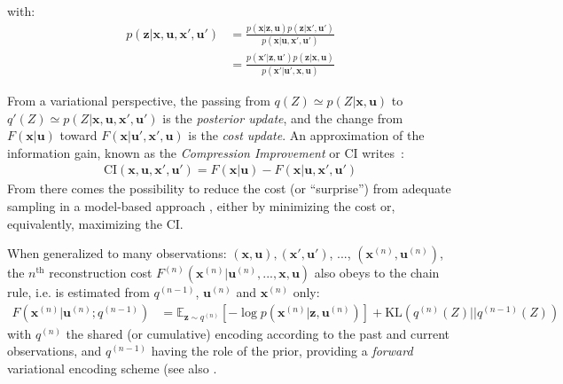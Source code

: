 \documentclass[12pt,twoside,openright]{article}
\begin{document}
with:
\begin{align} p(\boldsymbol{z}|\boldsymbol{x}, \boldsymbol{u}, \boldsymbol{x}', \boldsymbol{u}') &= \frac{p(\boldsymbol{x}|\boldsymbol{z}, \boldsymbol{u})p(\boldsymbol{z}|\boldsymbol{x}', \boldsymbol{u}')}{p(\boldsymbol{x}|\boldsymbol{u},\boldsymbol{x}',\boldsymbol{u}')}\nonumber\\
&= \frac{p(\boldsymbol{x}'|\boldsymbol{z}, \boldsymbol{u}')p(\boldsymbol{z}|\boldsymbol{x}, \boldsymbol{u})}{p(\boldsymbol{x}'|\boldsymbol{u}',\boldsymbol{x},\boldsymbol{u})}
\end{align} 

From a variational perspective, the passing from $q(Z) \simeq p(Z|\boldsymbol{x}, \boldsymbol{u})$ to $q'(Z) \simeq p(Z|\boldsymbol{x}, \boldsymbol{u}, \boldsymbol{x}', \boldsymbol{u}')$ is the \emph{posterior update}, and the change from $F(\boldsymbol{x}|\boldsymbol{u})$ toward   $F(\boldsymbol{x}|\boldsymbol{u}', \boldsymbol{x}', \boldsymbol{u})$ is the \emph{cost update}. 
An approximation of the information gain, known as the \emph{Compression Improvement} or CI \cite{schmidhuber2007simple,houthooft2016vime}
writes~:
\begin{align}
\text{CI}(\boldsymbol{x},\boldsymbol{u}, \boldsymbol{x}', \boldsymbol{u}') = F(\boldsymbol{x}|\boldsymbol{u}) - F(\boldsymbol{x}|\boldsymbol{u}, \boldsymbol{x}', \boldsymbol{u}') 
\end{align}	
From there comes the possibility to reduce the cost (or ``surprise'') from adequate sampling in a model-based approach \cite{friston2012perceptions}, either by minimizing the cost or, equivalently, maximizing the CI.


When generalized to many observations: $(\boldsymbol{x},\boldsymbol{u}), (\boldsymbol{x}',\boldsymbol{u}')$, ..., $(\boldsymbol{x}^{(n)},\boldsymbol{u}^{(n)})$, the $n^\text{th}$ reconstruction cost $F^{(n)}(\boldsymbol{x}^{(n)}|\boldsymbol{u}^{(n)}, ..., \boldsymbol{x}, \boldsymbol{u})$ also obeys to the chain rule, i.e. is estimated from $q^{(n-1)}$, $\boldsymbol{u}^{(n)}$ and $\boldsymbol{x}^{(n)}$ only:
\begin{align}
F(\boldsymbol{x}^{(n)}|\boldsymbol{u}^{(n)}; q^{(n-1)}) 
&= \mathbb{E}_{\boldsymbol{z} \sim q^{(n)}} \left[-\log p(\boldsymbol{x}^{(n)}| \boldsymbol{z}, \boldsymbol{u}^{(n)} )\right] + \text{KL}(q^{(n)}(Z)||q^{(n-1)}(Z))
\label{eq:FEP-uxun}
\end{align}
with $q^{(n)}$ the shared (or cumulative) encoding according to the past and current observations, and $q^{(n-1)}$ having the role of the prior, providing a \emph{forward} variational encoding scheme (see also \cite{chung2015recurrent,fraccaro2016sequential}.  
\end{document}
